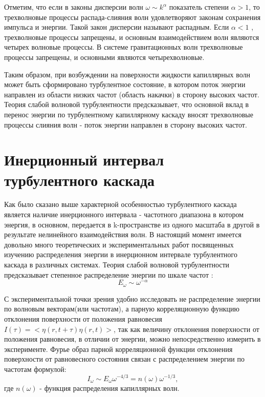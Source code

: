 Отметим, что если в законы дисперсии волн $\omega \sim k ^ \alpha$ показатель степени $\alpha > 1$, то трехволновые процессы распада-слияния волн удовлетворяют законам сохранения импульса и энергии. Такой закон дисперсии называют распадным. Если $\alpha < 1$ , трехволновые процессы запрещены, и основным взаимодействием волн являются четырех волновые процессы. В системе гравитационных волн трехволновые процессы запрещены, и основными являются четырехволновые. 

Таким образом, при возбуждении на поверхности жидкости капиллярных волн может быть сформировано турбулентное состояние, в котором поток энергии направлен из области низких частот (область накачки) в сторону высоких частот. Теория слабой волновой турбулентности \cite{Zakharov} предсказывает, что основной вклад в перенос энергии по турбулентному капиллярному каскаду вносят трехволновые процессы слияния волн - поток энергии направлен в сторону высоких частот. 


\section{Инерционный интервал турбулентного каскада}%

Как было сказано выше характерной особенностью турбулентного каскада является наличие инерционного интервала - частотного диапазона в котором энергия, в основном, передается в k-пространстве из одного масштаба в другой в результате нелинейного взаимодействия волн. 
В настоящий момент имеется довольно много теоретических и экспериментальных работ посвященных изучению распределения энергии в инерционном интервале турбулентного каскада в различных системах. Теория слабой волновой турбулентности предсказывает степенное распределение энергии по шкале частот \cite{Zakharov}:
\begin{equation}
\label{eq:EOmega}
E_\omega \sim \omega^{-\alpha}
\end{equation}

С экспериментальной точки зрения удобно исследовать не распределение энергии по волновым векторам(или частотам), а парную корреляционную функцию отклонения поверхности от положения равновесия $I(\tau)=<\eta(r, t+\tau)\eta(r,t)>$, так как величину отклонения поверхности от положения равновесия, в отличии от энергии, можно непосредственно измерить в эксперименте. Фурье образ парной корреляционной функции отклонения поверхности от равновесного состояния связан с распределением энергии по частотам формулой:
\begin{equation}
\label{eq:EOmegaI}
I_\omega \sim E_\omega \omega^{-4/3} = n(\omega) \omega^{-1/3},
\end{equation}
где $n(\omega)$ - функция распределения капиллярных волн.

